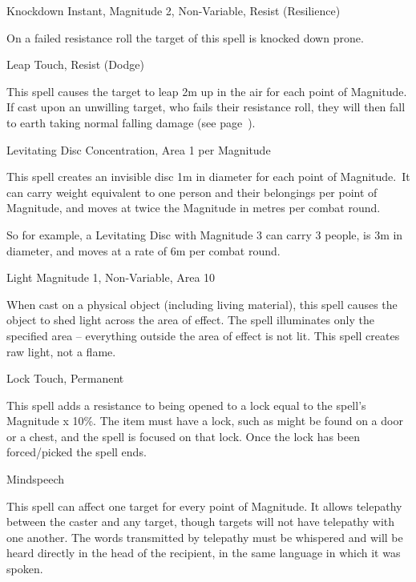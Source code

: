 \begin{rpg-spell}
{Knockdown}
{Instant, Magnitude 2, Non-Variable, Resist (Resilience)}

On a failed resistance roll the target of this spell is knocked down prone.
\end{rpg-spell}


\begin{rpg-spell}
{Leap}
{Touch, Resist (Dodge)}

This spell causes the target to leap 2m up in the air for each point of Magnitude. If cast upon an unwilling target, who fails their resistance roll, they will then fall to earth taking normal falling damage (see page~\pageref{ssec:falling}).
\end{rpg-spell}


\begin{rpg-spell}
{Levitating Disc}
{Concentration, Area 1 per Magnitude}

This spell creates an invisible disc 1m in diameter for each point of Magnitude. It can carry weight equivalent to one person and their belongings per point of Magnitude, and moves at twice the Magnitude in metres per combat round.

So for example, a Levitating Disc with Magnitude 3 can carry 3 people, is 3m in diameter, and moves at a rate of 6m per combat round.
\end{rpg-spell}


\begin{rpg-spell}
{Light}
{Magnitude 1, Non-Variable, Area 10}

When cast on a physical object (including living material), this spell causes the object to shed light across the area of effect. The spell illuminates only the specified area – everything outside the area of effect is not lit. This spell creates raw light, not a flame.
\end{rpg-spell}


\begin{rpg-spell}
{Lock}
{Touch, Permanent}

This spell adds a resistance to being opened to a lock equal to the spell’s Magnitude x 10\%. The item must have a lock, such as might be found on a door or a chest, and the spell is focused on that lock. Once the lock has been forced/picked the spell ends.
\end{rpg-spell}


\begin{rpg-spell}
{Mindspeech}
{}

This spell can affect one target for every point of Magnitude. It allows telepathy between the caster and any target, though targets will not have telepathy with one another. The words transmitted by telepathy must be whispered and will be heard directly in the head of the recipient, in the same language in which it was spoken. 
\end{rpg-spell}


